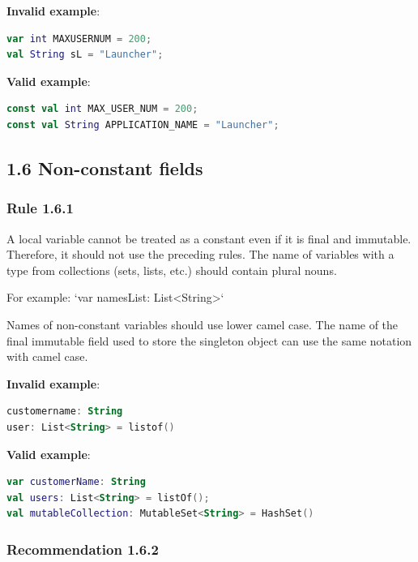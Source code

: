 \textbf{Invalid example}:



\begin{lstlisting}[language=Kotlin]
var int MAXUSERNUM = 200;
val String sL = "Launcher";
\end{lstlisting}


\textbf{Valid example}:



\begin{lstlisting}[language=Kotlin]
const val int MAX_USER_NUM = 200;
const val String APPLICATION_NAME = "Launcher";
\end{lstlisting}


\subsection*{\textbf{1.6 Non-constant fields}}

\subsubsection*{\textbf{Rule 1.6.1}}
\leavevmode\newline



A local variable cannot be treated as a constant even if it is final and immutable. Therefore, it should not use the preceding rules. The name of variables with a type from collections (sets, lists, etc.) should contain plural nouns.

For example: `var namesList: List<String>`



Names of non-constant variables should use lower camel case. The name of the final immutable field used to store the singleton object can use the same notation with camel case.



\textbf{Invalid example}:

\begin{lstlisting}[language=Kotlin]
customername: String
user: List<String> = listof()
\end{lstlisting}


\textbf{Valid example}:

\begin{lstlisting}[language=Kotlin]
var customerName: String
val users: List<String> = listOf();
val mutableCollection: MutableSet<String> = HashSet()
\end{lstlisting}


\subsubsection*{\textbf{Recommendation 1.6.2}}
\leavevmode\newline



